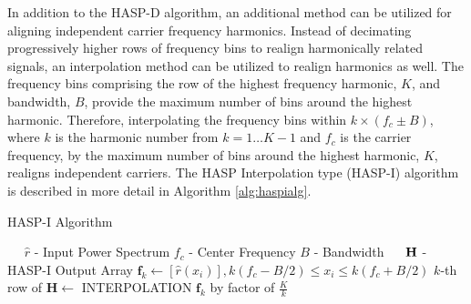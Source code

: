 

\appendix
\label{appendix:Harmonically Aligned Signal Projection Interpolation Type Appendix}                       

In addition to the HASP-D algorithm, an additional method can be utilized for aligning independent carrier frequency harmonics.  Instead of decimating progressively higher rows of frequency bins to realign harmonically related signals, an interpolation method can be utilized to realign harmonics as well.  The frequency bins comprising the row of the highest frequency harmonic, $K$, and bandwidth, $B$, provide the maximum number of bins around the highest harmonic.  Therefore, interpolating the frequency bins within $k \times (f_c \pm B)$, where $k$ is the harmonic number from $k = 1 \ldots K-1$ and $f_c$ is the carrier frequency, by the maximum number of bins around the highest harmonic, $K$, realigns independent carriers.  The HASP Interpolation type (HASP-I) algorithm is described in more detail in Algorithm \ref{alg:haspialg}.

\begin{algorithm}
	\caption{HASP-I Algorithm} \label{alg:haspialg}
	\scriptsize
	\begin{algorithmic}[1]
		\Require~~
		\Statex $\hat{r}$ - Input Power Spectrum
		\Statex $f_c$ - Center Frequency 
		\Statex $B$ - Bandwidth
		\Ensure~~
		\Statex $\bf{H}$ - HASP-I Output Array
		\Statex
		\State    $\mathbf{f}_k \gets \left[ \hat{r}(x_i) \right], k(f_c - B/2) \leq x_i \leq k(f_c + B/2)$
		\State		$k$-th row of $\mathbf{H} \gets$ INTERPOLATION $\mathbf{f}_k$ by factor of $\frac{K}{k}$
		\EndFor
	\end{algorithmic}
\end{algorithm}

